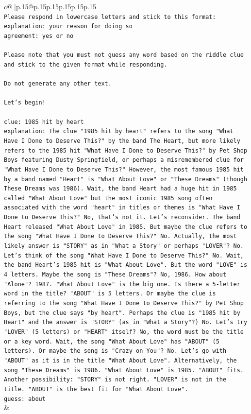 \documentclass{article}
\begin{document}
{\begin{supertabular}{c@{$\;$}|p{.15\linewidth}@{}p{.15\linewidth}p{.15\linewidth}p{.15\linewidth}p{.15\linewidth}p{.15\linewidth}}
{{{\\ 
\texttt{Please respond in lowercase letters and stick to this format:} \\
\texttt{explanation: your reason for doing so} \\
\texttt{agreement: yes or no} \\
\\ 
\texttt{Please note that you must not guess any word based on the riddle clue and stick to the given format while responding.} \\
\\ 
\texttt{Do not generate any other text.} \\
\\ 
\texttt{Let's begin!} \\
\\ 
\texttt{clue: 1985 hit by heart} \\
\texttt{explanation: The clue "1985 hit by heart" refers to the song "What Have I Done to Deserve This?" by the band The Heart, but more likely refers to the 1985 hit "What Have I Done to Deserve This?" by Pet Shop Boys featuring Dusty Springfield, or perhaps a misremembered clue for "What Have I Done to Deserve This?" However, the most famous 1985 hit by a band named "Heart" is "What About Love" or "These Dreams" (though These Dreams was 1986). Wait, the band Heart had a huge hit in 1985 called "What About Love" but the most iconic 1985 song often associated with the word "heart" in titles or themes is "What Have I Done to Deserve This?" No, that's not it. Let's reconsider. The band Heart released "What About Love" in 1985. But maybe the clue refers to the song "What Have I Done to Deserve This?" No. Actually, the most likely answer is "STORY" as in "What a Story" or perhaps "LOVER"? No. Let's think of the song "What Have I Done to Deserve This?" No. Wait, the band Heart's 1985 hit is "What About Love". But the word "LOVE" is 4 letters. Maybe the song is "These Dreams"? No, 1986. How about "Alone"? 1987. "What About Love" is the big one. Is there a 5{-}letter word in the title? "ABOUT" is 5 letters. Or maybe the clue is referring to the song "What Have I Done to Deserve This?" by Pet Shop Boys, but the clue says "by heart". Perhaps the clue is "1985 hit by Heart" and the answer is "STORY" (as in "What a Story"?) No. Let's try "LOVER" (5 letters) or "HEART" itself? No, the word must be the title or a key word. Wait, the song "What About Love" has "ABOUT" (5 letters). Or maybe the song is "Crazy on You"? No. Let's go with "ABOUT" as it is in the title "What About Love". Alternatively, the song "These Dreams" is 1986. "What About Love" is 1985. "ABOUT" fits. Another possibility: "STORY" is not right. "LOVER" is not in the title. "ABOUT" is the best fit for "What About Love".} \\
\texttt{guess: about} \\
            }
        }
    }
    & \\ \\


\end{supertabular}}
\end{document}

